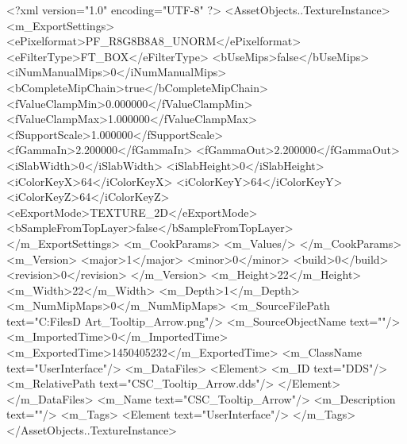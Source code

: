 <?xml version="1.0" encoding="UTF-8" ?>
<AssetObjects..TextureInstance>
	<m_ExportSettings>
		<ePixelformat>PF_R8G8B8A8_UNORM</ePixelformat>
		<eFilterType>FT_BOX</eFilterType>
		<bUseMips>false</bUseMips>
		<iNumManualMips>0</iNumManualMips>
		<bCompleteMipChain>true</bCompleteMipChain>
		<fValueClampMin>0.000000</fValueClampMin>
		<fValueClampMax>1.000000</fValueClampMax>
		<fSupportScale>1.000000</fSupportScale>
		<fGammaIn>2.200000</fGammaIn>
		<fGammaOut>2.200000</fGammaOut>
		<iSlabWidth>0</iSlabWidth>
		<iSlabHeight>0</iSlabHeight>
		<iColorKeyX>64</iColorKeyX>
		<iColorKeyY>64</iColorKeyY>
		<iColorKeyZ>64</iColorKeyZ>
		<eExportMode>TEXTURE_2D</eExportMode>
		<bSampleFromTopLayer>false</bSampleFromTopLayer>
	</m_ExportSettings>
	<m_CookParams>
		<m_Values/>
	</m_CookParams>
	<m_Version>
		<major>1</major>
		<minor>0</minor>
		<build>0</build>
		<revision>0</revision>
	</m_Version>
	<m_Height>22</m_Height>
	<m_Width>22</m_Width>
	<m_Depth>1</m_Depth>
	<m_NumMipMaps>0</m_NumMipMaps>
	<m_SourceFilePath text="C:\Users\Shadow\Desktop\Working Files\2D Art\Quarters\CSC_Tooltip_Arrow.png"/>
	<m_SourceObjectName text=""/>
	<m_ImportedTime>0</m_ImportedTime>
	<m_ExportedTime>1450405232</m_ExportedTime>
	<m_ClassName text="UserInterface"/>
	<m_DataFiles>
		<Element>
			<m_ID text="DDS"/>
			<m_RelativePath text="CSC_Tooltip_Arrow.dds"/>
		</Element>
	</m_DataFiles>
	<m_Name text="CSC_Tooltip_Arrow"/>
	<m_Description text=""/>
	<m_Tags>
		<Element text="UserInterface"/>
	</m_Tags>
</AssetObjects..TextureInstance>

